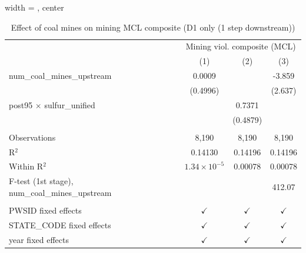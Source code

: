 
\begin{table}[htbp]
   
   \caption{\label{2sls_4step_d1_mining_mcl_composite} Effect of coal mines on mining MCL composite (D1 only (1 step downstream))}
   \bigskip
   
   \centering
   
   \begin{adjustbox}{width = \textwidth, center}
      
      
      \begin{tabular}{lccc}
         \toprule
         
          & \multicolumn{3}{c}{Mining viol. composite (MCL)}\\
         
                                                           & (1)                   & (2)           & (3)\\  
         
         \midrule 
         num\_coal\_mines\_upstream                        & 0.0009                &               & -3.859\\   
                                                           & (0.4996)              &               & (2.637)\\   
         post95 $\times$ sulfur\_unified                   &                       & 0.7371        &   \\   
                                                           &                       & (0.4879)      &   \\   
         
          \\
         
         Observations                                      & 8,190                 & 8,190         & 8,190\\  
         R$^2$                                             & 0.14130               & 0.14196       & 0.14196\\  
         Within R$^2$                                      & $1.34\times 10^{-5}$  & 0.00078       & 0.00078\\  
         F-test (1st stage), num\_coal\_mines\_upstream    &                       &               & 412.07\\  
         
          \\
         
         PWSID fixed effects                               & $\checkmark$          & $\checkmark$  & $\checkmark$\\   
         STATE\_CODE fixed effects                         & $\checkmark$          & $\checkmark$  & $\checkmark$\\   
         year fixed effects                                & $\checkmark$          & $\checkmark$  & $\checkmark$\\   
         

\end{tabular}
\end{adjustbox}
\end{table}
